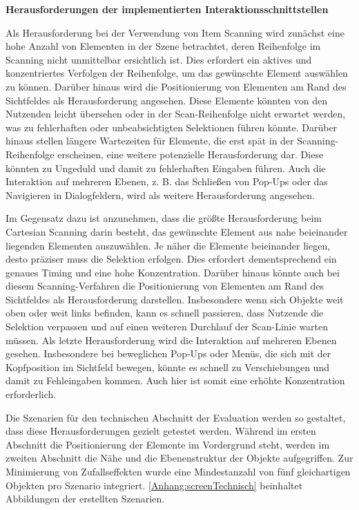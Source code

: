 \textbf{Herausforderungen der implementierten Interaktionsschnittstellen}

Als Herausforderung bei der Verwendung von Item Scanning wird zunächst eine hohe Anzahl von Elementen in der Szene betrachtet, deren Reihenfolge im Scanning nicht unmittelbar ersichtlich ist. Dies erfordert ein aktives und konzentriertes Verfolgen der Reihenfolge, um das gewünschte Element auswählen zu können. Darüber hinaus wird die Positionierung von Elementen am Rand des Sichtfeldes als Herausforderung angesehen. Diese Elemente könnten von den Nutzenden leicht übersehen oder in der Scan-Reihenfolge nicht erwartet werden, was zu fehlerhaften oder unbeabsichtigten Selektionen führen könnte. Darüber hinaus stellen längere Wartezeiten für Elemente, die erst spät in der Scanning-Reihenfolge erscheinen, eine weitere potenzielle Herausforderung dar. Diese könnten zu Ungeduld und damit zu fehlerhaften Eingaben führen. Auch die Interaktion auf mehreren Ebenen, z. B.  das Schließen von Pop-Ups oder das Navigieren in Dialogfeldern, wird als weitere Herausforderung angesehen.

Im Gegensatz dazu ist anzunehmen, dass die größte Herausforderung beim Cartesian Scanning darin besteht, das gewünschte Element aus nahe beieinander liegenden Elementen auszuwählen. Je näher die Elemente beieinander liegen, desto präziser muss die Selektion erfolgen. Dies erfordert dementsprechend ein genaues Timing und eine hohe Konzentration. Darüber hinaus könnte auch bei diesem Scanning-Verfahren die Positionierung von Elementen am Rand des Sichtfeldes als Herausforderung darstellen. Insbesondere wenn sich Objekte weit oben oder weit links befinden, kann es schnell passieren, dass Nutzende die Selektion verpassen und auf einen weiteren Durchlauf der Scan-Linie warten müssen. Als letzte Herausforderung wird die Interaktion auf mehreren Ebenen gesehen. Insbesondere bei beweglichen Pop-Ups oder Menüs, die sich mit der Kopfposition im Sichtfeld bewegen, könnte es schnell zu Verschiebungen und damit zu Fehleingaben kommen. Auch hier ist somit eine erhöhte Konzentration erforderlich. 

Die Szenarien für den technischen Abschnitt der Evaluation werden so gestaltet, dass diese Herausforderungen gezielt getestet werden. Während im ersten Abschnitt die Positionierung der Elemente im Vordergrund steht, werden im zweiten Abschnitt die Nähe und die Ebenenstruktur der Objekte aufgegriffen. Zur Minimierung von Zufallseffekten wurde eine Mindestanzahl von fünf gleichartigen Objekten pro Szenario integriert. \autoref{Anhang:screenTechnisch} beinhaltet Abbildungen der erstellten Szenarien. 

